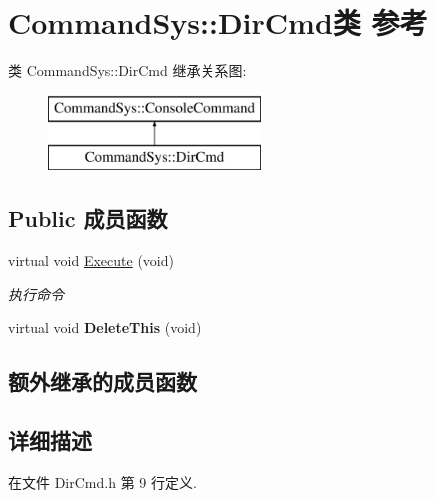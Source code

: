 \hypertarget{class_command_sys_1_1_dir_cmd}{\section{Command\-Sys\-:\-:Dir\-Cmd类 参考}
\label{class_command_sys_1_1_dir_cmd}
}
类 Command\-Sys\-:\-:Dir\-Cmd 继承关系图\-:\begin{figure}[H]
\begin{center}
\leavevmode
\includegraphics[height=2.000000cm]{class_command_sys_1_1_dir_cmd}
\end{center}
\end{figure}
\subsection*{Public 成员函数}
\begin{DoxyCompactItemize}
\item 
virtual void \hyperlink{class_command_sys_1_1_dir_cmd_ac19a660aea728dae9ab2161c63c945e9}{Execute} (void)
\begin{DoxyCompactList}\small\item\em 执行命令 \end{DoxyCompactList}\item 
\hypertarget{class_command_sys_1_1_dir_cmd_adb386912dae8856edf4db5311b5117b6}{virtual void {\bfseries Delete\-This} (void)}\label{class_command_sys_1_1_dir_cmd_adb386912dae8856edf4db5311b5117b6}

\end{DoxyCompactItemize}
\subsection*{额外继承的成员函数}


\subsection{详细描述}


在文件 Dir\-Cmd.\-h 第 9 行定义.



